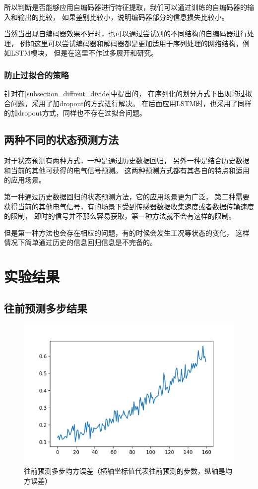 所以判断是否能够应用自编码器进行特征提取，我们可以通过训练的自编码器的输入和输出的比较，
如果差别比较小，说明编码器部分的信息损失比较小。

当然当出现自编码器效果不好时，也可以通过尝试别的不同结构的自编码器进行处理，
例如这里可以尝试编码器和解码器都是更加适用于序列处理的网络结构，例如LSTM模块，
但是在这里不作过多展开和研究。
\subsubsection{防止过拟合的策略}
针对在\ref{subsection_diffrent_divide}中提出的，
在序列化的划分方式下出现的过拟合问题，采用了加dropout的方式进行解决。
在后面应用LSTM时，也采用了同样的加dropout方式，同样也不存在过拟合问题。

\subsection{两种不同的状态预测方法}
对于状态预测有两种方式，一种是通过历史数据回归，
另外一种是结合历史数据和当前的其他可获得的电气信号预测。
这两种预测方式都有其各自的特点和适用的应用场景。

第一种通过历史数据回归的状态预测方法，它的应用场景更为广泛，
第二种需要获得当前的其他电气信号，有的场景下受到传感器数据收集速度或者数据传输速度的限制，
即时的信号并不那么容易获取，第一种方法就不会有这样的限制。

但是第一种方法也会存在相应的问题，有的时候会发生工况等状态的变化，
这样情况下简单通过历史的信息回归信息是不完备的。

\section{实验结果}

\subsection{往前预测多步结果}

  \begin{figure}
    \centering
    \includegraphics[width=0.8\linewidth]{figures/往前预测多步均方误差.png}
    \caption{往前预测多步均方误差（横轴坐标值代表往前预测的步数，纵轴是均方误差）}
    \label{fig:multi-step}
  \end{figure}


